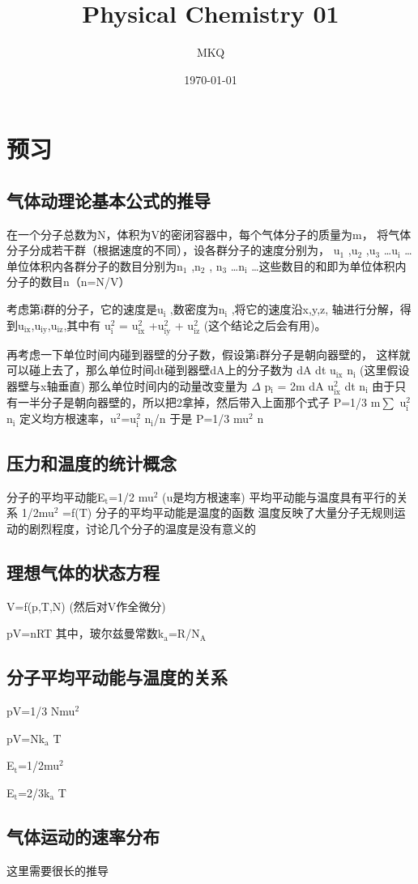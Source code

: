 \documentclass[11pt]{article}
\author{MKQ}
\date{\today}
\title{Physical Chemistry 01}
\begin{document}
\maketitle
\tableofcontents

\section{预习}
\label{sec:org2fbe567}
\subsection{气体动理论基本公式的推导}
\label{sec:orgcee8dc1}
在一个分子总数为N，体积为V的密闭容器中，每个气体分子的质量为m，
将气体分子分成若干群（根据速度的不同），设各群分子的速度分别为，
u\(_{\text{1}}\) ,u\(_{\text{2}}\) ,u\(_{\text{3}}\) \ldots{}u\(_{\text{i}}\) \ldots{}单位体积内各群分子的数目分别为n\(_{\text{1}}\) ,n\(_{\text{2}}\) ,
n\(_{\text{3}}\) \ldots{}n\(_{\text{i}}\) \ldots{}这些数目的和即为单位体积内分子的数目n（n=N/V）

考虑第i群的分子，它的速度是u\(_{\text{i}}\) ,数密度为n\(_{\text{i}}\) ,将它的速度沿x,y,z,
轴进行分解，得到u\(_{\text{ix}}\),u\(_{\text{iy}}\),u\(_{\text{iz}}\),其中有
u\(_{\text{i}}^{\text{2}}\) = u\(_{\text{ix}}^{\text{2}}\) +u\(_{\text{iy}}^{\text{2}}\) + u\(_{\text{iz}}^{\text{2}}\) (这个结论之后会有用)。

再考虑一下单位时间内碰到器壁的分子数，假设第i群分子是朝向器壁的，
这样就可以碰上去了，那么单位时间dt碰到器壁dA上的分子数为
dA dt u\(_{\text{ix}}\) n\(_{\text{i}}\) (这里假设器壁与x轴垂直)
那么单位时间内的动量改变量为
\(\Delta\) p\(_{\text{i}}\) = 2m dA u\(_{\text{ix}}^{\text{2}}\) dt n\(_{\text{i}}\)
由于只有一半分子是朝向器壁的，所以把2拿掉，然后带入上面那个式子
P=1/3 m\(\sum\) u\(_{\text{i}}^{\text{2}}\) n\(_{\text{i}}\)
定义均方根速率，u\(^{\text{2}}\)=\Singma u\(_{\text{i}}^{\text{2}}\) n\(_{\text{i}}\)/n
于是
P=1/3 mu\(^{\text{2}}\) n
\subsection{压力和温度的统计概念}
\label{sec:orga095b08}
分子的平均平动能E\(_{\text{t}}\)=1/2 mu\(^{\text{2}}\) (u是均方根速率)
平均平动能与温度具有平行的关系
1/2mu\(^{\text{2}}\) =f(T)
分子的平均平动能是温度的函数
温度反映了大量分子无规则运动的剧烈程度，讨论几个分子的温度是没有意义的

\subsection{理想气体的状态方程}
\label{sec:org1a727c5}
V=f(p,T,N)
(然后对V作全微分)

pV=nRT
其中，玻尔兹曼常数k\(_{\text{a}}\)=R/N\(_{\text{A}}\)
\subsection{分子平均平动能与温度的关系}
\label{sec:orge964fd6}
pV=1/3 Nmu\(^{\text{2}}\)

pV=Nk\(_{\text{a}}\) T

E\(_{\text{t}}\)=1/2mu\(^{\text{2}}\)

E\(_{\text{t}}\)=2/3k\(_{\text{a}}\) T
\subsection{气体运动的速率分布}
\label{sec:orgbac7895}
这里需要很长的推导
\end{document}
